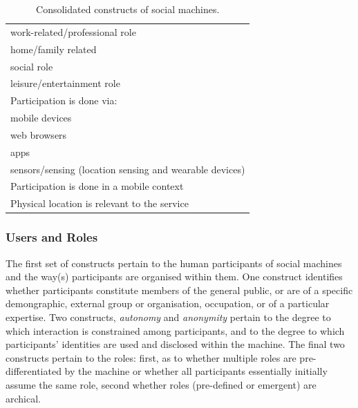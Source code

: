 \documentclass{sig-alternate}
\begin{document}
\begin{table}[htb]
\begin{center}
\begin{tabular}{|p{8cm}|}
\hspace{1cm} work-related/professional role \\
\hspace{1cm} home/family related \\
\hspace{1cm} social role \\
\hspace{1cm} leisure/entertainment role \\
Participation is done via: \\
\hspace{1cm} mobile devices \\
\hspace{1cm} web browsers \\
\hspace{1cm} apps \\
\hspace{1cm} sensors/sensing (location sensing and wearable devices) \\
Participation is done in a mobile context \\
\hspace{1cm} Physical location is relevant to the service \\
\hline
\end{tabular}
\end{center}
\caption{Consolidated constructs of social machines.} \label{table:constructs}
\end{table}

\subsubsection{Users and Roles}
The first set of constructs pertain to the human participants of
social machines and the way(s) participants are organised within them.
One construct identifies whether participants constitute members of
the general public, or are of a specific demongraphic, external group
or organisation, occupation, or of a particular expertise.  Two
constructs, \emph{autonomy} and \emph{anonymity} pertain to the degree
to which interaction is constrained among participants, and to the
degree to which participants' identities are used and disclosed within
the machine. The final two constructs pertain to the roles: first,
as to whether multiple roles are pre-differentiated by the machine or
whether all participants essentially initially assume the same role,
second whether roles (pre-defined or emergent) are archical.
\end{document}
